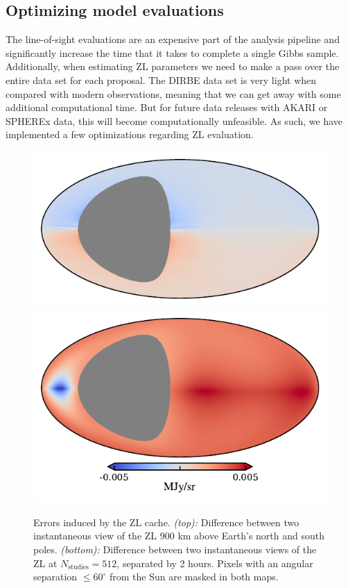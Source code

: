 \documentclass[twocolumn]{aa}
\begin{document}
\subsection{Optimizing model evaluations}\label{sect:optimization}
The line-of-sight evaluations are an expensive part of the analysis 
pipeline and significantly increase the time that it takes to complete a 
single Gibbs sample. Additionally, when estimating ZL parameters we need 
to make a pass over the entire data set for each proposal. The DIRBE 
data set is very light when compared with modern observations, meaning 
that we can get away with some additional computational time. But for 
future data releases with AKARI or SPHEREx data, this will become 
computationally unfeasible. As such, we have implemented a few 
optimizations regarding ZL evaluation. 
\begin{figure}
    \includegraphics[width=\columnwidth]{figs/cache_error_delta_t.pdf}
    \includegraphics[width=\columnwidth]{figs/cache_error_z.pdf}
    \caption{Errors induced by the ZL cache. \textit{(top):} Difference between two 
    instantaneous view of the ZL 900 km above Earth's north and south 
    poles. \textit{(bottom):} Difference between two instantaneous views of the ZL at $N_\mathrm{studies}=512$, 
    separated by 2 hours. Pixels with an angular separation $\leq 60^\circ$ from the Sun 
    are masked in both maps.}
    \label{fig:cache-error}
\end{figure}
\end{document}

